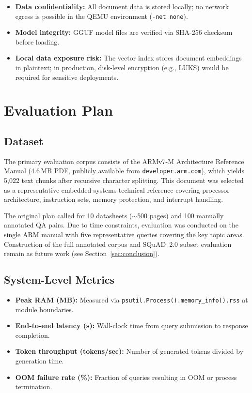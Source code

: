 \documentclass[10pt,twocolumn]{article}
\begin{document}
\begin{itemize}[leftmargin=*,itemsep=2pt]
  \item \textbf{Data confidentiality:} All document data is stored locally; no network egress is possible in the QEMU environment (\texttt{-net none}).
  \item \textbf{Model integrity:} GGUF model files are verified via SHA-256 checksum before loading.
  \item \textbf{Local data exposure risk:} The vector index stores document embeddings in plaintext; in production, disk-level encryption (e.g., LUKS) would be required for sensitive deployments.
\end{itemize}

\section{Evaluation Plan}
\label{sec:evaluation}

\subsection{Dataset}

The primary evaluation corpus consists of the ARMv7-M Architecture Reference Manual (4.6\,MB PDF, publicly available from \texttt{developer.arm.com}), which yields 5{,}022 text chunks after recursive character splitting. This document was selected as a representative embedded-systems technical reference covering processor architecture, instruction sets, memory protection, and interrupt handling.

The original plan called for 10 datasheets ($\sim$500 pages) and 100 manually annotated QA pairs. Due to time constraints, evaluation was conducted on the single ARM manual with five representative queries covering the key topic areas. Construction of the full annotated corpus and SQuAD~2.0 subset evaluation remain as future work (see Section~\ref{sec:conclusion}).

\subsection{System-Level Metrics}

\begin{itemize}[leftmargin=*,itemsep=2pt]
  \item \textbf{Peak RAM (MB):} Measured via \texttt{psutil.Process().memory\_info().rss} at module boundaries.
  \item \textbf{End-to-end latency (s):} Wall-clock time from query submission to response completion.
  \item \textbf{Token throughput (tokens/sec):} Number of generated tokens divided by generation time.
  \item \textbf{OOM failure rate (\%):} Fraction of queries resulting in OOM or process termination.
\end{itemize}
\end{document}
